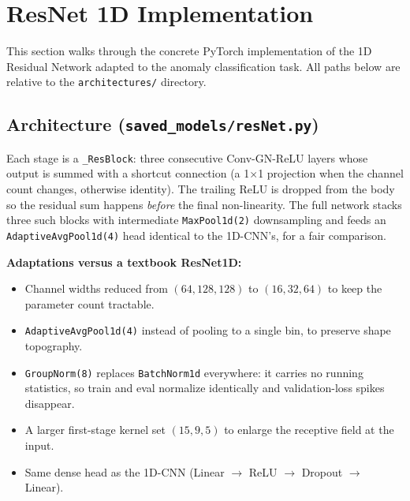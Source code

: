 \section{ResNet 1D Implementation}

This section walks through the concrete PyTorch implementation of the 1D Residual Network adapted to the anomaly classification task. All paths below are relative to the \texttt{architectures/} directory.

\subsection{Architecture (\texttt{saved\_models/resNet.py})}

Each stage is a \texttt{\_ResBlock}: three consecutive Conv-GN-ReLU layers whose output is summed with a shortcut connection (a 1$\times$1 projection when the channel count changes, otherwise identity). The trailing ReLU is dropped from the body so the residual sum happens \emph{before} the final non-linearity. The full network stacks three such blocks with intermediate \texttt{MaxPool1d(2)} downsampling and feeds an \texttt{AdaptiveAvgPool1d(4)} head identical to the 1D-CNN's, for a fair comparison.

\textbf{Adaptations versus a textbook ResNet1D:}
\begin{itemize}
    \item Channel widths reduced from $(64,128,128)$ to $(16,32,64)$ to keep the parameter count tractable.
    \item \texttt{AdaptiveAvgPool1d(4)} instead of pooling to a single bin, to preserve shape topography.
    \item \texttt{GroupNorm(8)} replaces \texttt{BatchNorm1d} everywhere: it carries no running statistics, so train and eval normalize identically and validation-loss spikes disappear.
    \item A larger first-stage kernel set $(15,9,5)$ to enlarge the receptive field at the input.
    \item Same dense head as the 1D-CNN (Linear $\rightarrow$ ReLU $\rightarrow$ Dropout $\rightarrow$ Linear).
\end{itemize}

